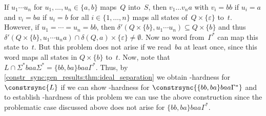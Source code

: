 \begin{remark}
	If $u_1 \cdots u_n$ for $u_1,\ldots,u_n \in \{a,b\}$
	maps~$Q$ into~$S$,
	then $v_1 \dots v_n a$ with $v_i = bb$ if $u_i = a$
	and $v_i = ba$ if $u_i = b$ for all $i \in \{1,\ldots,n\}$
	maps all states of~$Q \times \{\varepsilon\}$ to~$t$.
	However, if $u_1 = \cdots = u_n = bb$,
	then $\delta'(Q \times \{b\}, u_1\cdots u_n) \subseteq Q \times \{b\}$
	and thus $\delta'(Q \times \{b\}, u_1 \cdots u_n a) \cap \delta(Q, a) \times \{\varepsilon\} \ne \emptyset$.
	Now no word from~$\Gamma^*$ can map this state to~$t$.
	But this problem does not arise if we read~$ba$
	at least once, since this word maps all states in $Q \times \{b\}$
	to~$t$.
	Now, note that $L \cap \Sigma^* baa \Sigma^* = \{bb,ba\}baa\Gamma^*$.
	Thus, by \cref{constr_sync:gen_results:thm:ideal_separation} we obtain \PSPACE-hardness for $\constrsync{L}$
	if we can show \PSPACE-hardness
	for $\constrsync{\{bb,ba\}baa\Gamma^*}$
	and to establish \PSPACE-hardness of this problem
	we can use the above construction since the problematic case discussed above
	does not arise for $\{bb,ba\}baa\Gamma^*$.
\end{remark}
